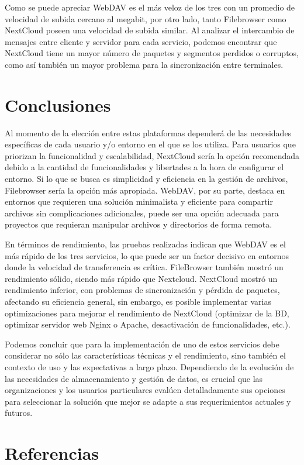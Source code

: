 \documentclass[a4paper,10pt]{article}
\begin{document}
	Como se puede apreciar WebDAV es el más veloz de los tres con un promedio de velocidad de subida cercano al megabit, por otro lado, tanto Filebrowser como NextCloud poseen una velocidad de subida similar. Al analizar el intercambio de mensajes entre cliente y servidor para cada servicio, podemos encontrar que NextCloud tiene un mayor número de paquetes y segmentos perdidos o corruptos, como así también un mayor problema para la sincronización entre terminales.
	
	\section{Conclusiones}
	Al momento de la elección entre estas plataformas dependerá de las necesidades específicas de cada usuario y/o entorno en el que se los utiliza. Para usuarios que priorizan la funcionalidad y escalabilidad, NextCloud sería la opción recomendada debido a la cantidad de funcionalidades y libertades a la hora de configurar el entorno. Si lo que se busca es simplicidad y eficiencia en la gestión de archivos, Filebrowser sería la opción más apropiada. WebDAV, por su parte, destaca en entornos que requieren una solución minimalista y eficiente para compartir archivos sin complicaciones adicionales, puede ser una opción adecuada para proyectos que requieran manipular archivos y directorios de forma remota.
	
	En términos de rendimiento, las pruebas realizadas indican que WebDAV es el más rápido de los tres servicios, lo que puede ser un factor decisivo en entornos donde la velocidad de transferencia es crítica. FileBrowser también mostró un rendimiento sólido, siendo más rápido que Nextcloud. NextCloud mostró un rendimiento inferior, con problemas de sincronización y pérdida de paquetes, afectando su eficiencia general, sin embargo, es posible implementar varias optimizaciones para mejorar el rendimiento de NextCloud (optimizar de la BD, optimizar servidor web Nginx o Apache, desactivación de funcionalidades, etc.).
	
	Podemos concluir que para la implementación de uno de estos servicios debe considerar no sólo las características técnicas y el rendimiento, sino también el contexto de uso y las expectativas a largo plazo. Dependiendo de la evolución de las necesidades de almacenamiento y gestión de datos, es crucial que las organizaciones y los usuarios particulares evalúen detalladamente sus opciones para seleccionar la solución que mejor se adapte a sus requerimientos actuales y futuros.
	
	\nocite{*}	
	\section{Referencias}
	\printbibliography[heading=none]
\end{document}

